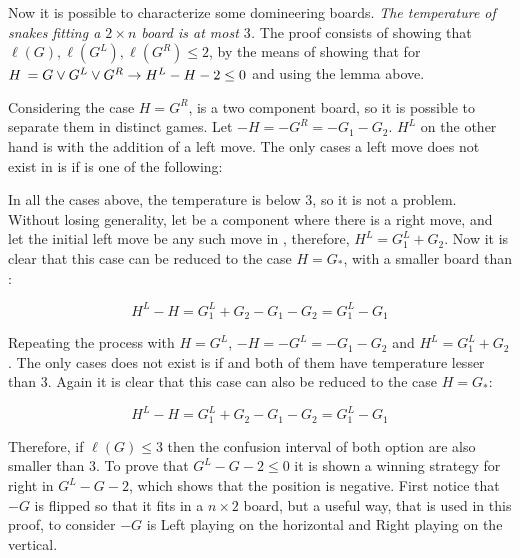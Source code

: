 Now it is possible to characterize some domineering boards. \textit{The temperature of snakes fitting a $2\times n$ board is at most $3$.} The proof consists of showing that $\ell(G), \ell(G^L), \ell(G^R) \leq 2$, by the means of showing that for $\mbox{$H\,$} = G \lor G^L \lor G^R \rightarrow H^L -H -2 \leq 0$ and using the lemma above.

Considering the case $H = G^R$, \Hm is a two component board, so it is possible to separate them in distinct games. Let $-H = -G^R = -G_1 - G_2$. $H^L$ on the other hand is  with the addition of a left move. The only cases a left move does not exist in  is if \Gm{} is one of the following:



In all the cases above, the temperature is below 3, so it is not a problem. Without losing generality, let  be a component where there is a right move, and let the initial left move be any such move in , therefore, $H^L = G_1^L + G_2$. Now it is clear that this case can be reduced to the case $H = G_*$, with \Gm{_*} a smaller board than \Gm{}:

$$
H^L - H = G_1^L + G_2 - G_1 - G_2 = G_1^L - G_1
$$

Repeating the process with $H = G^L$, $-H = -G^L = -G_1 - G_2$ and $H^L = G_1^L + G_2$. The only cases  does not exist is if
 and both of them have temperature lesser than 3. Again it is clear that this case can also be reduced to the case $H = G_*$:

$$
H^L - H = G_1^L + G_2 - G_1 - G_2 = G_1^L - G_1
$$

Therefore, if $\ell(G) \leq 3$ then the confusion interval of both option are also smaller than 3. To prove that $G^L - G - 2 \leq 0$ it is shown a winning strategy for right in $G^L - G - 2$, which shows that the position is negative. First notice that $-G$ is \Gm{} flipped so that it fits in a $n\times 2$ board, but a useful way, that is used in this proof, to consider $-G$ is Left playing on the horizontal and Right playing on the vertical.

